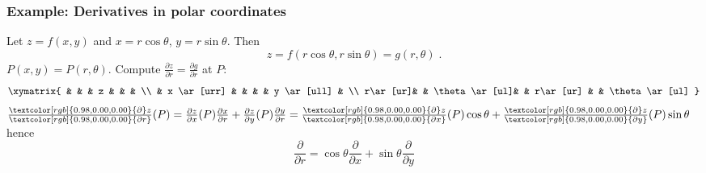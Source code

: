 \begin{frame}
  \frametitle{Example: Derivatives in polar coordinates}

Let $z=f(x,y)$ and $x=r\cos\theta$, $y=r\sin\theta$. Then
%
$$z=f(r\cos\theta, r\sin\theta) = g(r, \theta) \; .$$
%
$P(x,y) = P(r,\theta)$. Compute $\frac{\partial z}{\partial r} = \frac{\partial g}{\partial r}$ at $P$:
%
$$\xymatrix{
 &   &        & z &    &   & \\
 & x \ar[urr] &        &   &    & y \ar[ull] & \\
r\ar[ur]&   & \theta \ar[ul]&   &  r\ar[ur] &   & \theta \ar[ul]
}$$
%
$
  \frac{\textcolor[rgb]{0.98,0.00,0.00}{\partial} z}{\textcolor[rgb]{0.98,0.00,0.00}{\partial r}} (P) = \frac{\partial z}{\partial x} (P)\frac{\partial x}{\partial r} + \frac{\partial z}{\partial y}(P) \frac{\partial y}{\partial r} = \frac{\textcolor[rgb]{0.98,0.00,0.00}{\partial} z}{\textcolor[rgb]{0.98,0.00,0.00}{\partial x}}(P) \cos\theta + \frac{\textcolor[rgb]{0.98,0.00,0.00}{\partial} z}{\textcolor[rgb]{0.98,0.00,0.00}{\partial y}} (P) \sin\theta
$
%
hence
%
$$\frac{\partial}{\partial r} = \cos\theta\frac{\partial }{\partial x}  + \sin\theta\frac{\partial }{\partial y} $$
\end{frame}